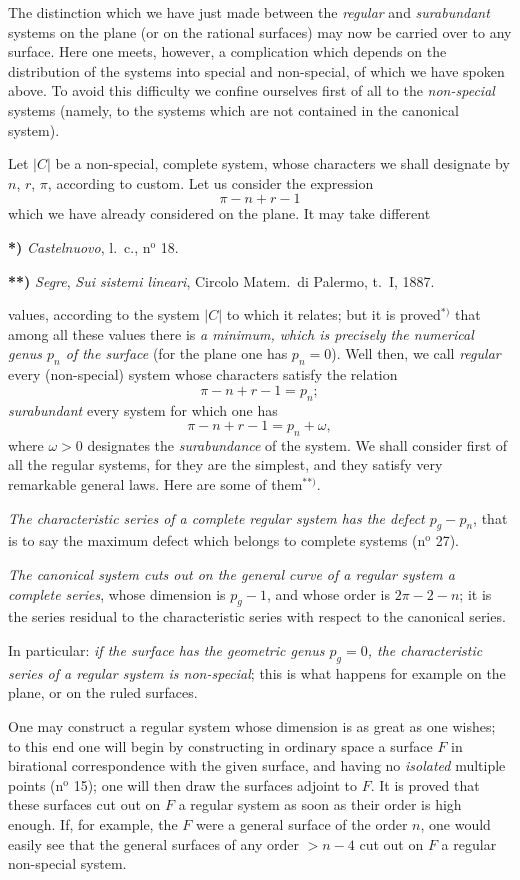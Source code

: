\documentclass{article}
\begin{document}
The distinction which we have just made between the \emph{regular} and \emph{surabundant} systems on the plane (or on the rational surfaces) may now be carried over to any surface. Here one meets, however, a complication which depends on the distribution of the systems into special and non-special, of which we have spoken above. To avoid this difficulty we confine ourselves first of all to the \emph{non-special} systems (namely, to the systems which are not contained in the canonical system).

Let $|C|$ be a non-special, complete system, whose characters we shall designate by $n$, $r$, $\pi$, according to custom. Let us consider the expression
\[ \pi - n + r - 1 \]
which we have already considered on the plane. It may take different

\textbf{*)} \emph{Castelnuovo}, l.\ c., n${}^{\text{o}}$ 18.

\textbf{**)} \emph{Segre}, \emph{Sui sistemi lineari}, Circolo Matem.\ di Palermo, t.\ I, 1887.

values, according to the system $|C|$ to which it relates; but it is proved${}^{*)}$ that among all these values there is \emph{a minimum, which is precisely the numerical genus $p_{n}$ of the surface} (for the plane one has $p_{n} = 0$). Well then, we call \emph{regular} every (non-special) system whose characters satisfy the relation
\[ \pi - n + r - 1 = p_{n}; \tag{4} \]
\emph{surabundant} every system for which one has
\[ \pi - n + r - 1 = p_{n} + \omega, \tag{5} \]
where $\omega > 0$ designates the \emph{surabundance} of the system. We shall consider first of all the regular systems, for they are the simplest, and they satisfy very remarkable general laws. Here are some of them${}^{**)}$.

\emph{The characteristic series of a complete regular system has the defect $p_{g} - p_{n}$}, that is to say the maximum defect which belongs to complete systems (n${}^{\text{o}}$ 27).

\emph{The canonical system cuts out on the general curve of a regular system a complete series}, whose dimension is $p_{g} - 1$, and whose order is $2\pi - 2 - n$; it is the series residual to the characteristic series with respect to the canonical series.

In particular: \emph{if the surface has the geometric genus $p_{g} = 0$, the characteristic series of a regular system is non-special}; this is what happens for example on the plane, or on the ruled surfaces.

One may construct a regular system whose dimension is as great as one wishes; to this end one will begin by constructing in ordinary space a surface $F$ in birational correspondence with the given surface, and having no \emph{isolated} multiple points (n${}^{\text{o}}$ 15); one will then draw the surfaces adjoint to $F$. It is proved that these surfaces cut out on $F$ a regular system as soon as their order is high enough. If, for example, the $F$ were a general surface of the order $n$, one would easily see that the general surfaces of any order $> n - 4$ cut out on $F$ a regular non-special system.
\end{document}
